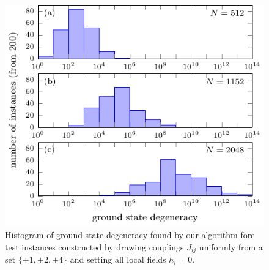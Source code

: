 \begin{figure}
  \includegraphics[width=\textwidth]{figures/tn-ground-degeneracy.pdf}
  \caption{Histogram of ground state degeneracy found by our algorithm fore test instances
    constructed by drawing couplings $J_{ij}$ uniformly from a set $\{\pm 1, \pm 2,
        \pm 4\}$ and setting all local fields $h_{i} = 0$.}
  \label{fig:ground-degeneracy}
\end{figure}
